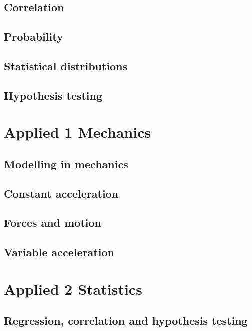 \documentclass[oneside,fleqn,11pt]{book}
\begin{document}
\chapter{Correlation}


\chapter{Probability}


\chapter{Statistical distributions}


\chapter{Hypothesis testing}


\part{Applied 1 Mechanics}
\setcounter{chapter}{7}
\chapter{Modelling in mechanics}


\chapter{Constant acceleration}


\chapter{Forces and motion}


\chapter{Variable acceleration}



\part{Applied 2 Statistics}
\chapter{Regression, correlation and hypothesis testing}

\end{document}
